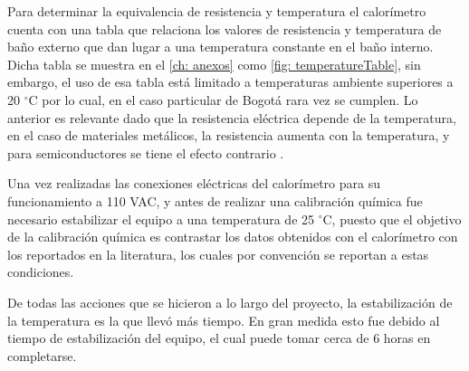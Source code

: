 	Para determinar la equivalencia de resistencia y temperatura el calorímetro cuenta con una tabla que relaciona los valores de resistencia y temperatura de ba\~no externo que dan lugar a una temperatura constante en el ba\~no interno. Dicha tabla se muestra en el \autoref{ch: anexos} como \autoref{fig: temperatureTable}, sin embargo, el uso de esa tabla est\'a limitado a temperaturas ambiente superiores a 20 $^\circ$C por lo cual, en el caso particular de Bogot\'a rara vez se cumplen. Lo anterior es relevante dado que la resistencia el\'ectrica depende de la temperatura, en el caso de materiales met\'alicos, la resistencia aumenta con la temperatura, y para semiconductores se tiene el efecto contrario \cite{simon2013oxford}.
	
	Una vez realizadas las conexiones el\'ectricas del calor\'imetro para su funcionamiento a 110 VAC, y antes de realizar una calibraci\'on qu\'imica fue necesario estabilizar el equipo a una temperatura de 25 $^\circ$C, puesto que el objetivo de la calibraci\'on qu\'imica es contrastar los datos obtenidos con el calor\'imetro con los reportados en la literatura, los cuales por convenci\'on se reportan a estas condiciones.
	
	De todas las acciones que se hicieron a lo largo del proyecto, la estabilizaci\'on de la temperatura es la que llev\'o m\'as tiempo. En gran medida esto fue debido al tiempo de estabilizaci\'on del equipo, el cual puede tomar cerca de 6 horas en completarse.